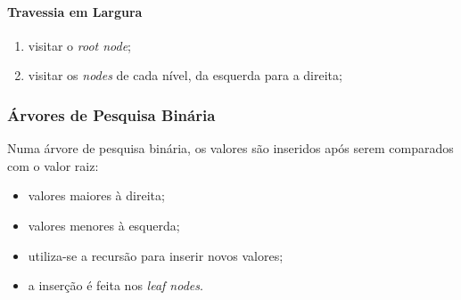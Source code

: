 \documentclass[a4paper, 12pt]{article}
\begin{document}
\paragraph{Travessia em Largura}
\begin{enumerate}
    \item visitar o \emph{root node};
    \item visitar os \emph{nodes} de cada nível, da esquerda para a direita;
\end{enumerate}

\subsubsection{Árvores de Pesquisa Binária}
Numa árvore de pesquisa binária, os valores são inseridos após serem comparados com o valor raiz:
\begin{itemize}
    \item valores maiores à direita;
    \item valores menores à esquerda;
    \item utiliza-se a recursão para inserir novos valores;
    \item a inserção é feita nos \emph{leaf nodes}.
\end{itemize}
\end{document}
